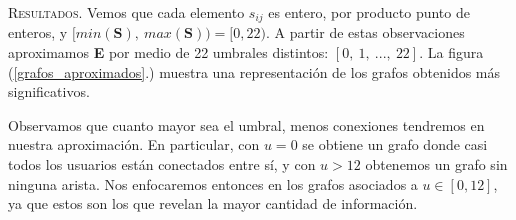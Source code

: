 \vspace{2em}
\noindent \textsc{Resultados}. Vemos que cada elemento $s_{ij}$ es entero, por producto punto de enteros, y $[min(\mathbf{S}),\ max(\mathbf{S})) = [0, 22)$. A partir de estas observaciones aproximamos \textbf{E} por medio de 22 umbrales distintos: $[0,\ 1,\ ...,\ 22]$. La figura (\ref{grafos_aproximados}.) muestra una representación de los grafos obtenidos más significativos. 


\vspace{1em}
Observamos que cuanto mayor sea el umbral, menos conexiones tendremos en nuestra aproximación. En particular, con $u = 0$ se obtiene un grafo donde casi todos los usuarios están conectados entre sí, y con $u > 12$ obtenemos un grafo sin ninguna arista. Nos enfocaremos entonces en los grafos asociados a $u \in [0, 12]$, ya que estos son los que revelan la mayor cantidad de información. 

